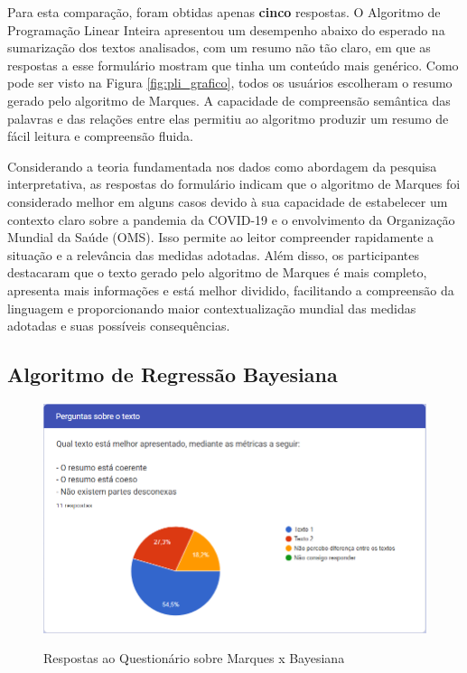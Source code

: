 Para esta comparação, foram obtidas apenas \textbf{cinco} respostas. O Algoritmo de Programação Linear Inteira apresentou um desempenho abaixo do esperado na sumarização dos textos analisados, com um resumo não tão claro, em que as respostas a esse formulário mostram que tinha um conteúdo mais genérico. Como pode ser visto na Figura \ref{fig:pli_grafico}, todos os usuários escolheram o resumo gerado pelo algoritmo de Marques. A capacidade de compreensão semântica das palavras e das relações entre elas permitiu ao algoritmo produzir um resumo de fácil leitura e compreensão fluida.

Considerando a teoria fundamentada nos dados como abordagem da pesquisa interpretativa, as respostas do formulário indicam que o algoritmo de Marques foi considerado melhor em alguns casos devido à sua capacidade de estabelecer um contexto claro sobre a pandemia da COVID-19 e o envolvimento da Organização Mundial da Saúde (OMS). Isso permite ao leitor compreender rapidamente a situação e a relevância das medidas adotadas. Além disso, os participantes destacaram que o texto gerado pelo algoritmo de Marques é mais completo, apresenta mais informações e está melhor dividido, facilitando a compreensão da linguagem e proporcionando maior contextualização mundial das medidas adotadas e suas possíveis consequências.

\subsection{Algoritmo de Regressão Bayesiana}
\label{chap:bayesiana}

\begin{figure}[!h]
    \centering
    \caption{Respostas ao Questionário sobre Marques x Bayesiana}
    \includegraphics[width=\textwidth]{figuras/graficos/bayesiana.png}
    \label{fig:bayesiana_grafico}
\end{figure}

